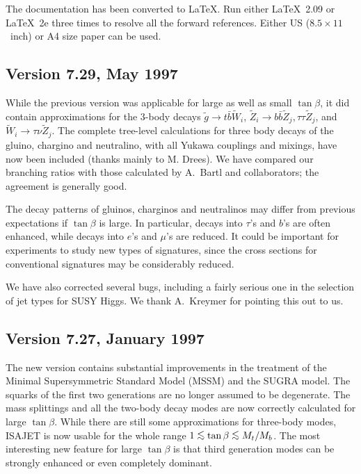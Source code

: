         The documentation has been converted to \LaTeX. Run either
\LaTeX~2.09 or \LaTeX~2e three times to resolve all the forward
references. Either US ($8.5\times11$~inch) or A4 size paper can be
used.

\subsection{Version 7.29, May 1997}

      While the previous version was applicable for large as well as
small $\tan\beta$, it did contain approximations for the 3-body decays
$\tilde g \to t \bar b \tilde W_i$, $\tilde Z_i \to b \bar b \tilde
Z_j, \tau \tau \tilde Z_j$, and $\tilde W_i \to \tau \nu \tilde Z_j$.
The complete tree-level calculations for three body decays of the
gluino, chargino and neutralino, with all Yukawa couplings and
mixings, have now been included (thanks mainly to M. Drees).  We have
compared our branching ratios with those calculated by A.~Bartl and
collaborators; the agreement is generally good.

      The decay patterns of gluinos, charginos and neutralinos may
differ from previous expectations if $\tan\beta$ is large.  In
particular, decays into $\tau$'s and $b$'s are often enhanced, while
decays into $e$'s and $\mu$'s are reduced.  It could be important for
experiments to study new types of signatures, since the cross sections
for conventional signatures may be considerably reduced.

      We have also corrected several bugs, including a fairly
serious one in the selection of jet types for SUSY Higgs. We thank
A.~Kreymer for pointing this out to us.

\subsection{Version 7.27, January 1997}

      The new version contains substantial improvements in the
treatment of the Minimal Supersymmetric Standard Model (MSSM) and the
SUGRA model.  The squarks of the first two generations are no longer
assumed to be degenerate.  The mass splittings and all the two-body
decay modes are now correctly calculated for large $\tan\beta$.  While
there are still some approximations for three-body modes, ISAJET is
now usable for the whole range $1 \simle \tan\beta \simle M_t/M_b$.  The
most interesting new feature for large $\tan\beta$ is that third
generation modes can be strongly enhanced or even completely dominant.

